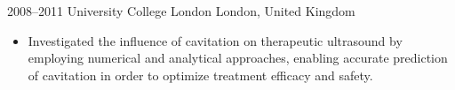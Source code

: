 \documentclass[english, print]{cv-style-wide}
\begin{document}
\begin{entrylist}

\entry
  {2008--2011}
  {University College London}
  {London, United Kingdom}
  {
  	\begin{itemize}
      \item Investigated the influence of cavitation on therapeutic ultrasound by employing numerical and analytical approaches, enabling accurate prediction of cavitation in order to optimize treatment efficacy and safety.
    \end{itemize}}

\end{entrylist}


\vspace{-0.2cm}
\end{document}
